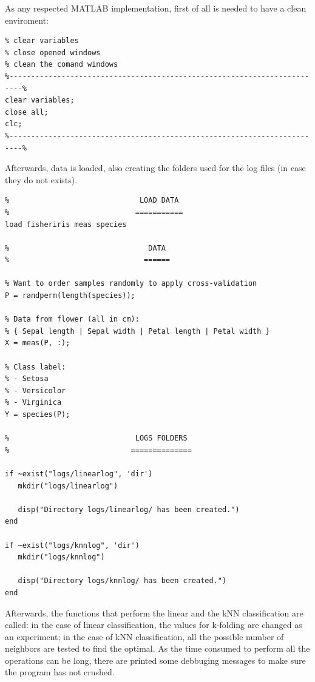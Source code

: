 \documentclass[11pt]{article}
\begin{document}
As any respected MATLAB implementation, first of all is needed to have a clean
enviroment:

\begin{verbatim}
% clear variables
% close opened windows
% clean the comand windows
%-------------------------------------------------------------------------%
clear variables;
close all;
clc;
%-------------------------------------------------------------------------%
\end{verbatim}

Afterwards, data is loaded, also creating the folders used for the log files (in
case they do not exists).

\begin{verbatim}
%                              LOAD DATA
%                             ===========
load fisheriris meas species

%                                DATA 
%                               ======

% Want to order samples randomly to apply cross-validation
P = randperm(length(species));

% Data from flower (all in cm):
% { Sepal length | Sepal width | Petal length | Petal width }
X = meas(P, :);

% Class label:
% - Setosa
% - Versicolor
% - Virginica
Y = species(P);

%                             LOGS FOLDERS
%                            ==============

if ~exist("logs/linearlog", 'dir')
   mkdir("logs/linearlog")
   
   disp("Directory logs/linearlog/ has been created.")
end

if ~exist("logs/knnlog", 'dir') 
   mkdir("logs/knnlog")
   
   disp("Directory logs/knnlog/ has been created.")
end
\end{verbatim}

Afterwards, the functions that perform the linear and the kNN classification are
called: in the case of linear classification, the values for k-folding are
changed as an experiment; in the case of kNN classification, all the possible 
number of neighbors are tested to find the optimal. As the time consumed to
perform all the operations can be long, there are printed some debbuging
messages to make sure the program has not crushed.
\end{document}
